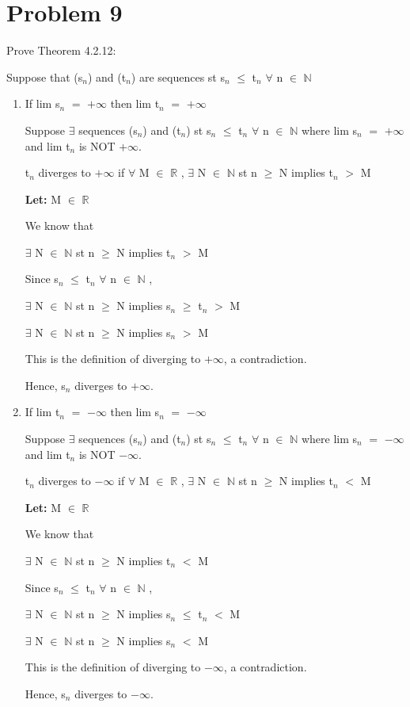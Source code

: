 \documentclass{article}
\newcommand{\mt}[1]{\ensuremath{#1}}
\newcommand\bsc[2][\DefaultOpt]{%
  \def\DefaultOpt{#2}%
  \section[#1]{#2}%
}
\newcommand{\balist}{\begin{enumerate}[label=\alph*.]}
\newcommand{\elist}{\end{enumerate}}
\newcommand{\lt}[1]{\textbf{Let: } #1}
\newcommand{\br}{\mt{\mathbb{R}} }       %
\newcommand{\bn}{\mt{\mathbb{N}} }       %
\newcommand{\fa}{\mt{\forall} }          %
\newcommand{\mem}{\mt{\in} }
\newcommand{\exs}{\mt{\exists} }
\newcommand{\prn}[1]{(#1)}
\newcommand{\ls}{\mt{<} }
\newcommand{\gr}{\mt{>} }
\newcommand{\lse}{\mt{\leq} }
\newcommand{\gre}{\mt{\geq} }
\newcommand{\eql}{\mt{=} }
\newcommand{\uw}[2]{#1\mt{_{#2}}}
\begin{document}
\bsc{Problem 9}{
Prove Theorem 4.2.12:

Suppose that \prn{\uw{s}{n}} and \prn{\uw{t}{n}} are sequences st \uw{s}{n} \lse \uw{t}{n} \fa n \mem \bn

\balist
\item If lim \uw{s}{n} \eql $+\infty$ then lim \uw{t}{n} \eql $+\infty$
	
	Suppose \exs sequences \prn{\uw{s}{n}} and \prn{\uw{t}{n}} st \uw{s}{n} \lse \uw{t}{n} \fa n \mem \bn where lim \uw{s}{n} \eql $+\infty$ and  lim \uw{t}{n} is NOT $+\infty$.
	
	\uw{t}{n} diverges to $+\infty$ if \fa M \mem \br, \exs N \mem \bn st n \gre N implies \uw{t}{n} \gr M
	
	\lt{M \mem \br}
	
	We know that
	
	\exs N \mem \bn st n \gre N implies \uw{t}{n} \gr M
	
	Since \uw{s}{n} \lse \uw{t}{n} \fa n \mem \bn,
	
	\exs N \mem \bn st n \gre N implies \uw{s}{n} \gre \uw{t}{n} \gr M
	
	\exs N \mem \bn st n \gre N implies \uw{s}{n} \gr M
	
	This is the definition of diverging to $+\infty$, a contradiction.
	
	Hence, \uw{s}{n} diverges to $+\infty$.
	
\item If lim \uw{t}{n} \eql $-\infty$ then lim \uw{s}{n} \eql $-\infty$
	
	Suppose \exs sequences \prn{\uw{s}{n}} and \prn{\uw{t}{n}} st \uw{s}{n} \lse \uw{t}{n} \fa n \mem \bn where lim \uw{s}{n} \eql $-\infty$ and  lim \uw{t}{n} is NOT $-\infty$.
	
	\uw{t}{n} diverges to $-\infty$ if \fa M \mem \br, \exs N \mem \bn st n \gre N implies \uw{t}{n} \ls M
	
	\lt{M \mem \br}
	
	We know that
	
	\exs N \mem \bn st n \gre N implies \uw{t}{n} \ls M
	
	Since \uw{s}{n} \lse \uw{t}{n} \fa n \mem \bn,
	
	\exs N \mem \bn st n \gre N implies \uw{s}{n} \lse \uw{t}{n} \ls M
	
	\exs N \mem \bn st n \gre N implies \uw{s}{n} \ls M
	
	This is the definition of diverging to $-\infty$, a contradiction.
	
	Hence, \uw{s}{n} diverges to $-\infty$.
\elist
}
\end{document}
